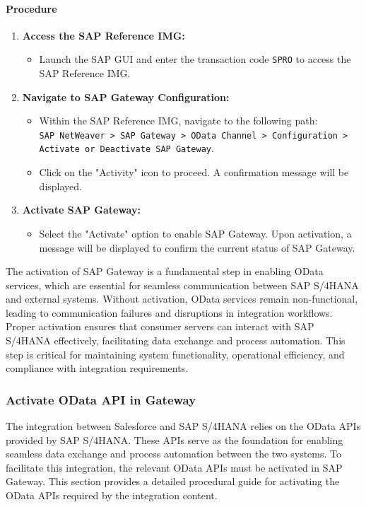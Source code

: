 \paragraph{Procedure}
\begin{enumerate}
    \item \textbf{Access the SAP Reference IMG:}
    \begin{itemize}
        \item Launch the SAP GUI and enter the transaction code \texttt{SPRO} to access the SAP Reference IMG.
    \end{itemize}

    \item \textbf{Navigate to SAP Gateway Configuration:}
    \begin{itemize}
        \item Within the SAP Reference IMG, navigate to the following path: \\
        \texttt{SAP NetWeaver > SAP Gateway > OData Channel > Configuration > Activate or Deactivate SAP Gateway}.
        \item Click on the "Activity" icon to proceed. A confirmation message will be displayed.
    \end{itemize}

    \item \textbf{Activate SAP Gateway:}
    \begin{itemize}
        \item Select the "Activate" option to enable SAP Gateway. Upon activation, a message will be displayed to confirm the current status of SAP Gateway.
    \end{itemize}
\end{enumerate}

The activation of SAP Gateway is a fundamental step in enabling OData services, which are essential for seamless communication between SAP S/4HANA and external systems. Without activation, OData services remain non-functional, leading to communication failures and disruptions in integration workflows. Proper activation ensures that consumer servers can interact with SAP S/4HANA effectively, facilitating data exchange and process automation. This step is critical for maintaining system functionality, operational efficiency, and compliance with integration requirements.


\subsubsection{Activate OData API in Gateway}
The integration between Salesforce and SAP S/4HANA relies on the OData APIs provided by SAP S/4HANA. These APIs serve as the foundation for enabling seamless data exchange and process automation between the two systems. To facilitate this integration, the relevant OData APIs must be activated in SAP Gateway. This section provides a detailed procedural guide for activating the OData APIs required by the integration content.

